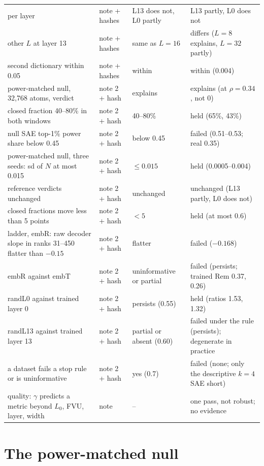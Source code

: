 \documentclass{article}
\newcommand{\Lz}{L_0}
\begin{document}
\begin{table}[!htb]
\begin{tabular}{p{4.6cm} p{2.0cm} p{2.6cm} p{6.4cm}}
\quad per layer & note + hashes & L13 does not, L0 partly & L13 partly, L0 does not \\
\quad other $L$ at layer 13 & note + hashes & same as $L=16$ & differs ($L=8$ explains, $L=32$ partly) \\
\quad second dictionary within 0.05 & note + hashes & within & within (0.004) \\
power-matched null, 32,768 atoms, verdict & note 2 + hash & explains & explains (at $\rho=0.34$, not 0) \\
\quad closed fraction 40--80\% in both windows & note 2 + hash & 40--80\% & held (65\%, 43\%) \\
\quad null SAE top-1\% power share below 0.45 & note 2 + hash & below 0.45 & failed (0.51--0.53; real 0.35) \\
power-matched null, three seeds: sd of $N$ at most 0.015 & note 2 + hash & $\le 0.015$ & held (0.0005--0.004) \\
\quad reference verdicts unchanged & note 2 + hash & unchanged & unchanged (L13 partly, L0 does not) \\
\quad closed fractions move less than 5 points & note 2 + hash & $<5$ & held (at most 0.6) \\
ladder, embR: raw decoder slope in ranks 31--450 flatter than $-0.15$ & note 2 + hash & flatter & failed ($-0.168$) \\
\quad embR against embT & note 2 + hash & uninformative or partial & failed (persists; trained Rem 0.37, 0.26) \\
\quad randL0 against trained layer 0 & note 2 + hash & persists (0.55) & held (ratios 1.53, 1.32) \\
\quad randL13 against trained layer 13 & note 2 + hash & partial or absent (0.60) & failed under the rule (persists); degenerate in practice \\
\quad a dataset fails a stop rule or is uninformative & note 2 + hash & yes (0.7) & failed (none; only the descriptive $k=4$ SAE short) \\
quality: $\gamma$ predicts a metric beyond $\Lz$, FVU, layer, width & note & -- & one pass, not robust; no evidence \\
\bottomrule
\end{tabular}
\end{table}

\section{The power-matched null}
\label{app:pmatch}
\end{document}
